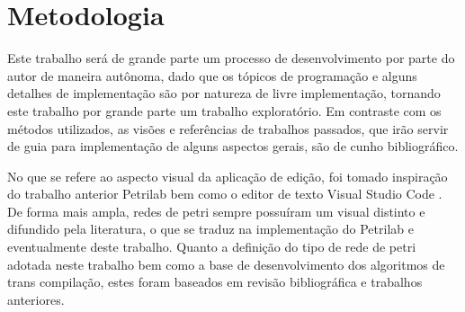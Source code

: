 \chapter{Metodologia}

Este trabalho será de grande parte um processo de desenvolvimento por parte do autor de maneira autônoma, dado que os tópicos de programação e alguns detalhes de implementação são por natureza de livre implementação, tornando este trabalho por grande parte um trabalho exploratório. Em contraste com os métodos utilizados, as visões e referências de trabalhos passados, que irão servir de guia para implementação de alguns aspectos gerais, são de cunho bibliográfico.

No que se refere ao aspecto visual da aplicação de edição, foi tomado inspiração do trabalho anterior Petrilab \cite{de2015petrilab} bem como o editor de texto Visual Studio Code \cite{vscode}. De forma mais ampla, redes de petri sempre possuíram um visual distinto e difundido pela literatura, o que se traduz na implementação do Petrilab e eventualmente deste trabalho. Quanto a definição do tipo de rede de petri adotada neste trabalho bem como a base de desenvolvimento dos algoritmos de trans compilação, estes foram baseados em revisão bibliográfica e trabalhos anteriores.